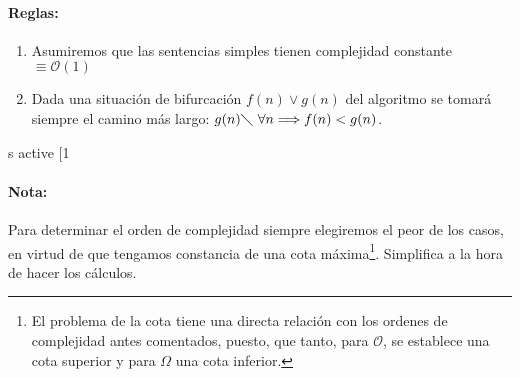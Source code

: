 \paragraph*{Reglas:} 

\begin{enumerate}
\item Asumiremos que las sentencias simples tienen complejidad constante $\equiv \mathcal{O}(1)$
\item Dada una situación de bifurcación $f(n) \vee g(n)$ del algoritmo se tomará siempre el camino más largo:
\ejem $g(n) \diagdown\ \forall n \Longrightarrow f(n) < g(n)$.
\end{enumerate}s active [1
\paragraph*{Nota:} Para determinar el orden de complejidad siempre elegiremos el peor de los casos, en virtud de que tengamos constancia de una cota máxima\footnote{El problema de la cota tiene una directa relación con los ordenes de complejidad antes comentados, puesto, que tanto, para $\mathcal{O}$, se establece una cota superior y para $\Omega$ una cota inferior.}. Simplifica a la hora de hacer los cálculos.

% 
% 
% 
% 
% 
% 
% 
% 

